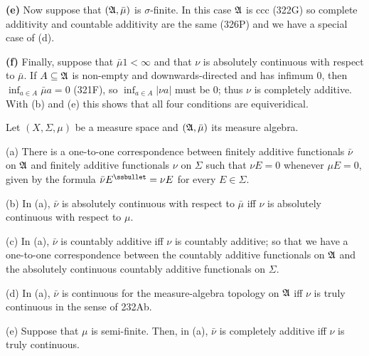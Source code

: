 {\medskip

{\bf (e)} Now suppose that $(\frak A,\bar\mu)$ is $\sigma$-finite.   In
this case $\frak A$ is ccc (322G) so  complete additivity and countable
additivity are the same (326P) and we have a special case of (d).

\medskip

{\bf (f)} Finally, suppose that $\bar\mu 1<\infty$ and that $\nu$ is
absolutely continuous with respect to $\bar\mu$.   If
$A\subseteq\frak A$ is non-empty and downwards-directed and has infimum
$0$, then
$\inf_{a\in A}\bar\mu a=0$ (321F), so $\inf_{a\in A}|\nu a|$ must be
$0$;  thus $\nu$ is completely additive.   With (b) and (e) this shows
that all four conditions are equiveridical.
}%

 Let $(X,\Sigma,\mu)$ be a measure space
and $(\frak A,\bar\mu)$ its measure algebra.

(a) There is a one-to-one correspondence between finitely additive
functionals $\bar\nu$ on $\frak A$ and finitely additive functionals
$\nu$ on $\Sigma$ such that $\nu E=0$ whenever $\mu E=0$,
given by the formula $\bar\nu E^{\ssbullet}=\nu E$ for every
$E\in\Sigma$.

(b) In (a), $\bar\nu$ is absolutely continuous with respect to $\bar\mu$
iff $\nu$ is absolutely continuous with respect to $\mu$.

(c) In (a), $\bar\nu$ is countably additive iff $\nu$ is countably
additive;  so that we have a one-to-one correspondence between the
countably additive functionals on $\frak A$ and the absolutely
continuous countably additive functionals on $\Sigma$.

(d) In (a), $\bar\nu$ is continuous for the measure-algebra topology on
$\frak A$ iff $\nu$ is truly continuous in the sense of 232Ab.

(e) Suppose that $\mu$ is semi-finite.   Then, in (a), $\bar\nu$ is
completely additive iff $\nu$ is truly continuous.

